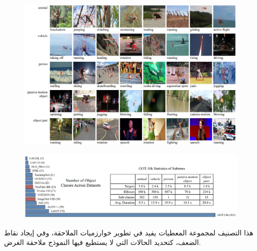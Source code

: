 \begin{figure}[H]
	\centerline{\includegraphics[width=\textwidth]{images/got10k}}
	\caption{
		}
	\label{fig:got10k}
\end{figure}
\begin{figure}[H]
	\centerline{\includegraphics[width=\textwidth]{images/got10k_classes}}
	\caption{
		}
	\label{fig:got10k-classes}
\end{figure}

هذا التصنيف لمجموعة المعطيات يفيد في تطوير خوارزميات الملاحقة، وفي إيجاد نقاط الضعف، كتحديد الحالات التي لا يستطيع فيها النموذج ملاحقة الغرض.
